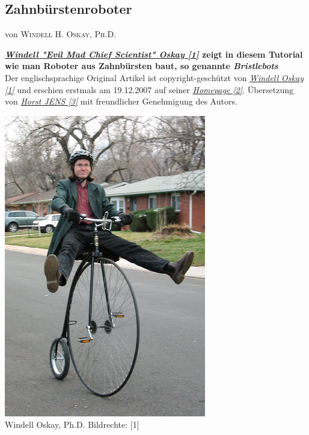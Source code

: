 \documentclass[10pt,a4paper,ngerman,twoside]{article} %
\newcommand{\NewsItem}[1]{ %
\usefont{T1}{fvs}{n}{n} %
\vspace{24pt}\large #1\vspace{3pt} %
\par \normalsize \normalfont}
\newcommand{\NewsAuthor}[1]{ %
\hfill von \textsc{#1} \vspace{20pt} %
\par \normalfont}
\begin{document}
\begin{multicols}{3}
\NewsItem{}
\section*{Zahnbürstenroboter} 
\label{bristlebot}
\NewsAuthor{Windell H. Oskay, Ph.D.}


\textbf{\href{http://www.evilmadscientist.com/about/}{\textit{Windell "Evil Mad Chief Scientist" Oskay [1]}} zeigt in diesem Tutorial wie man Roboter aus Zahnbürsten baut, so genannte \textit{Bristlebots}} \\

Der englischsprachige Original Artikel ist copyright-geschützt von \href{http://www.evilmadscientist.com/about/}{\textit{Windell Oskay [1]}} und erschien erstmals am 19.12.2007 auf seiner \href{http://www.evilmadscientist.com/go/bristlebot}{\textit{Homepage [2]}}. Übersetzung von \href{http://spielend-programmieren.at}{\textit{Horst JENS [3]}} mit freundlicher Genehmigung des Autors.

\begin{center}
\includegraphics[width=\linewidth]{bristlebot/bristlebot-evilmadscientist.jpg}\\
\footnotesize{Windell Oskay, Ph.D. Bildrechte: [1]}
\end{center}


\end{multicols}
\end{document}

